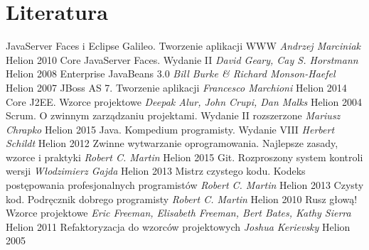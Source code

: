 \chapter{Literatura}
\begin{thebibliography}{99}
	 JavaServer Faces i Eclipse Galileo. Tworzenie aplikacji WWW \emph{Andrzej Marciniak} Helion 2010
	 Core JavaServer Faces. Wydanie II \emph{David Geary, Cay S. Horstmann} Helion 2008
	 Enterprise JavaBeans 3.0 \emph{Bill Burke \& Richard Monson-Haefel} Helion 2007
	 JBoss AS 7. Tworzenie aplikacji \emph{Francesco Marchioni} Helion 2014
	 Core J2EE. Wzorce projektowe \emph{Deepak Alur, John Crupi, Dan Malks} Helion 2004
	 Scrum. O zwinnym zarządzaniu projektami. Wydanie II rozszerzone \emph{Mariusz Chrapko} Helion 2015
	 Java. Kompedium programisty. Wydanie VIII \emph{Herbert Schildt} Helion 2012
	 Zwinne wytwarzanie oprogramowania. Najlepsze zasady, wzorce i praktyki \emph{Robert C. Martin} Helion 2015
	 Git. Rozproszony system kontroli wersji \emph{Włodzimierz Gajda} Helion 2013
	 Mistrz czystego kodu. Kodeks postępowania profesjonalnych programistów \emph{Robert C. Martin} Helion 2013
	 Czysty kod. Podręcznik dobrego programisty \emph{Robert C. Martin} Helion 2010
	 Rusz głową! Wzorce projektowe \emph{Eric Freeman, Elisabeth Freeman, Bert Bates, Kathy Sierra} Helion 2011
	 Refaktoryzacja do wzorców projektowych \emph{Joshua Kerievsky} Helion 2005	
\end{thebibliography}